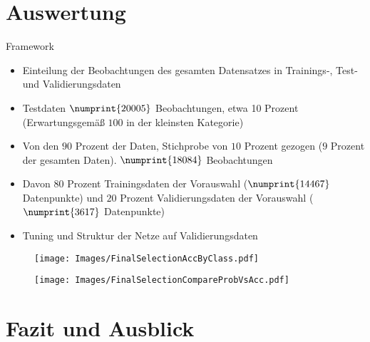 \documentclass[10pt, xcolor = dvipsnames]{beamer}
\begin{document}
\section{Auswertung}

\begin{frame}{Framework}
\begin{itemize}
    \item Einteilung der  Beobachtungen des gesamten Datensatzes in Trainings-, Test- und Validierungsdaten \item Testdaten $\numprint{20005}$ Beobachtungen, etwa 10 Prozent (Erwartungsgemäß $100$ in der kleinsten Kategorie)
    \item Von den $90$ Prozent der Daten, Stichprobe von $10$ Prozent gezogen ($9$ Prozent der gesamten Daten). $\numprint{18084}$ Beobachtungen
    \item Davon $80$ Prozent Trainingsdaten der Vorauswahl ($\numprint{14467}$ Datenpunkte) und $20$ Prozent  Validierungsdaten der Vorauswahl ($\numprint{3617}$ Datenpunkte)
    \item Tuning und Struktur der Netze auf Validierungsdaten
\end{itemize}{}
\end{frame}{}

\begin{frame}
\begin{figure}[ht]
    \centering
\texttt{[image: Images/FinalSelectionAccByClass.pdf]} 
\caption{}
\label{abb:AccByClass}
\end{figure}
\end{frame}

\begin{frame}
\begin{figure}[ht]
    \centering
\texttt{[image: Images/FinalSelectionCompareProbVsAcc.pdf]} 
\caption{}
\label{abb:CompareProbVsAcc}
\end{figure}
\end{frame}




\section{Fazit und Ausblick}
\end{document}
